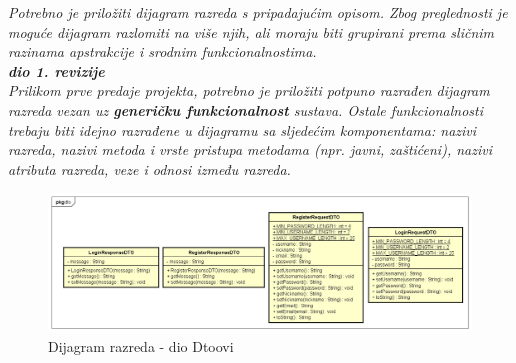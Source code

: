 			\textit{Potrebno je priložiti dijagram razreda s pripadajućim opisom. Zbog preglednosti je moguće dijagram razlomiti na više njih, ali moraju biti grupirani prema sličnim razinama apstrakcije i srodnim funkcionalnostima.}\\
			
			\textbf{\textit{dio 1. revizije}}\\
			
			\textit{Prilikom prve predaje projekta, potrebno je priložiti potpuno razrađen dijagram razreda vezan uz \textbf{generičku funkcionalnost} sustava. Ostale funkcionalnosti trebaju biti idejno razrađene u dijagramu sa sljedećim komponentama: nazivi razreda, nazivi metoda i vrste pristupa metodama (npr. javni, zaštićeni), nazivi atributa razreda, veze i odnosi između razreda.}\\
			
			
			\begin{figure}[h]
				\includegraphics[width=\textwidth]{dijagrami/UML dtoovi.png}
				\caption{Dijagram razreda - dio Dtoovi}
			\end{figure}
		
